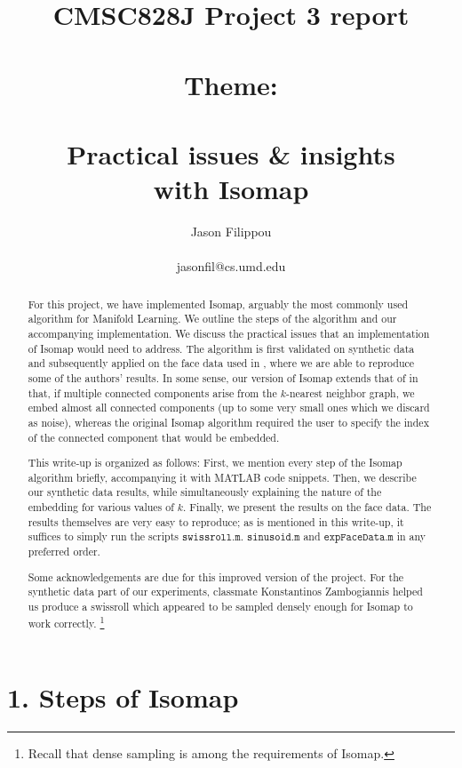 \documentclass[a4paper,12pt]{report}
\title{CMSC828J Project 3 report \\  \ \\ Theme: \\ \ \\ Practical issues \& insights \\  with Isomap}
\author{Jason Filippou \\ \ \\ jasonfil@cs.umd.edu}
\begin{document}
\maketitle


\begin{abstract}

For this project, we have implemented Isomap, arguably the most commonly used algorithm for Manifold Learning. We outline the
steps of the algorithm and our accompanying implementation. We discuss the practical issues that an implementation of Isomap would need to address. The algorithm is first validated on synthetic data and subsequently applied on the face data used in \cite{Tenenbaum2000}, where we are able to reproduce some of the authors' results. In some sense, our version of Isomap extends that of \cite{Tenenbaum2000} in that, if multiple connected components arise from the $k$-nearest neighbor graph, we embed almost all connected components (up to some very small ones which we discard as noise), whereas the original Isomap algorithm required the user to specify the index of the connected component that would be embedded. 

This write-up is organized as follows: First, we mention every step of the Isomap algorithm briefly, accompanying it with MATLAB code snippets. Then, we describe our synthetic data results, while simultaneously explaining the nature of the embedding for various values of $k$. Finally, we present the results on the face data. The results themselves are very easy to reproduce; as is mentioned in this write-up, it suffices to simply run the scripts $\texttt{swissroll.m}$. $\texttt{sinusoid.m}$ and $\texttt{expFaceData.m}$ in any preferred order.

Some acknowledgements are due for this improved version of the project. For the synthetic data part of our experiments, classmate Konstantinos Zambogiannis helped us produce a swissroll which appeared to be sampled densely enough for Isomap to work correctly. \footnote{Recall that dense sampling is among the requirements of Isomap.} 

\end{abstract}

\section*{1. Steps of Isomap}
\end{document}
